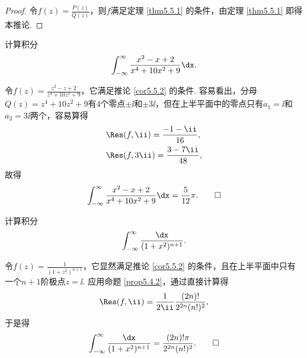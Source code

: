 \begin{proof}
令$f(z)=\frac{P(z)}{Q(z)}$，则$f$满足定理 \ref{thm5.5.1} 的条件，由定理 \ref{thm5.5.1} 即得本推论.
\end{proof}
\begin{example}\label{exam5.5.3}
计算积分
\[\int_{-\infty}^\infty\frac{x^2-x+2}{x^4+10x^2+9}\dx.\]
\end{example}
\begin{solution}
令$f(z)=\frac{z^2-z+2}{z^4+10z^2+9}$，它满足推论 \ref{cor5.5.2} 的条件. 容易看出，分母$Q(z)=z^4+10z^2+9$有$4$个零点$\pm\ii$和$\pm3\ii$，但在上半平面中的零点只有$a_1=\ii$和$a_2=3\ii$两个，容易算得
\begin{align*}
&\Res(f,\ii)=\frac{-1-\ii}{16},\\
&\Res(f,3\ii)=\frac{3-7\ii}{48},
\end{align*}
故得
\begin{equation*}
  \int_{-\infty}^\infty\frac{x^2-x+2}{x^4+10x^2+9}\dx = \frac5{12}\pi. \qedhere
\end{equation*}
\end{solution}

\begin{example}\label{exam5.5.4}
计算积分
\[\int_{-\infty}^\infty\frac{\dx}{(1+x^2)^{n+1}}.\]
\end{example}
\begin{solution}
令$f(z)=\frac1{(1+z^2)^{n+1}}$，它显然满足推论 \ref{cor5.5.2} 的条件，且在上半平面中只有一个$n+1$阶极点$z=\ii$. 应用命题 \ref{prop5.4.2}，通过直接计算得
\[\Res(f,\ii)=\frac1{2\ii}\frac{(2n)!}{2^{2n}(n!)^2},\]
于是得
\begin{equation*}
  \int_{-\infty}^\infty\frac{\dx}{(1+x^2)^{n+1}} = \frac{(2n)!\pi}{2^{2n}(n!)^2}. \qedhere
\end{equation*}
\end{solution}

